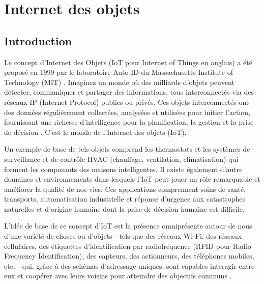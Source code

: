 \chapter{Internet des objets}

\section{Introduction}
Le concept  d’Internet des Objets (IoT pour Internet of Things en anglais) a été proposé en 1999 par le laboratoire Auto-ID du Massachusetts Institute of Technology (MIT) \cite{hu2016security}.
Imaginez un monde où des milliards d'objets peuvent détecter, communiquer et partager des informations, tous interconnectés via des réseaux IP (Internet Protocol) publics ou privés. Ces objets interconnectés ont des données régulièrement collectées, analysées et utilisées pour initier l'action, fournissant une richesse d'intelligence pour la planif{\kern0pt}ication, la gestion et la prise de décision \cite{patel2016iot}. C'est le monde de l'Internet des objets (IoT).


Un exemple de base de tels objets comprend les thermostats et les systèmes de surveillance et de contrôle HVAC (chauf{\kern0pt}fage, ventilation, climatisation) qui forment les composants des maisons intelligentes. Il existe également d’autre domaines et environnements dans lesquels l’IoT peut jouer un rôle remarquable et améliorer la qualité de nos vies. Ces applications comprennent soins de santé, transports, automatisation industrielle et réponse d'urgence aux catastrophes naturelles et d'origine humaine dont la prise de décision humaine est dif{\kern0pt}f{\kern0pt}icile.


L'idée de base de ce concept d’IoT est la présence omniprésente autour de nous d'une variété de choses ou d'objets - tels que des réseaux Wi-Fi, des réseaux cellulaires, des étiquettes d'identif{\kern0pt}ication par radiofréquence (RFID pour Radio Frequency Identif{\kern0pt}ication), des capteurs, des actionneurs, des téléphones mobiles, etc. - qui, grâce à des schémas d'adressage uniques, sont capables interagir entre eux et coopérer avec leurs voisins pour atteindre des objectifs communs \cite{atzori2010iot}.



